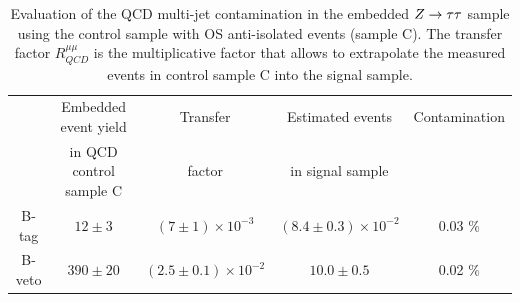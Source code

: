 \begin{table} [!htp]
\begin{footnotesize}
\centering
\begin{tabular}{c c c c c}
\hline
\hline
 & Embedded event yield	& Transfer	& Estimated events	& Contamination \\
 &  in QCD control sample C		& factor	& in signal sample	&	\\		 [0.5ex]
\hline
B-tag  & $12 \pm 3$ & $ (7 \pm 1) \times 10^{-3}$ &  $(8.4 \pm 0.3) \times 10^{-2}$ &  0.03 \% \\
B-veto & $390 \pm 20$ & $(2.5 \pm 0.1) \times 10^{-2}$ & $10.0 \pm 0.5$ & 0.02 \% \\[1ex]
\hline
\end{tabular}
\end{footnotesize}
\caption{Evaluation of the QCD multi-jet contamination  in the embedded $Z\rightarrow \tau\tau$ sample  using the control sample
 with OS anti-isolated events (sample C). The transfer factor $R_{QCD}^{\mu\mu}$ is the
multiplicative factor that allows to extrapolate the measured events in control sample C into the signal sample.}
\label{table:emb_cont_qcd}
\end{table}



